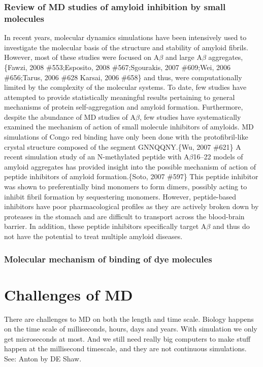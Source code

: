 \subsubsection{Review of MD studies of amyloid inhibition by small molecules}
\1 In recent years, molecular dynamics simulations have been intensively used to investigate the molecular basis of the structure and stability of amyloid fibrils. However, most of these studies were focused on A$\beta$ and large A$\beta$ aggregates,\{Fawzi, 2008 \#553;Esposito, 2008 \#567;Sgourakis, 2007 \#609;Wei, 2006 \#656;Tarus, 2006 \#628 Karsai, 2006 \#658\} and thus, were computationally limited by the complexity of the molecular systems. To date, few studies have attempted to provide statistically meaningful results pertaining to general mechanisms of protein self-aggregation and amyloid formation. Furthermore, despite the abundance of MD studies of A$\beta$, few studies have systematically examined the mechanism of action of small molecule inhibitors of amyloids. MD simulations of Congo red binding have only been done with the protofibril-like crystal structure composed of the segment GNNQQNY.\{Wu, 2007 \#621\} A recent simulation study of an N-methylated peptide with A$\beta$16--22 models of amyloid aggregates has provided insight into the possible mechanism of action of peptide inhibitors of amyloid formation.\{Soto, 2007 \#597\} This peptide inhibitor was shown to preferentially bind monomers to form dimers, possibly acting to inhibit fibril formation by sequestering monomers. However, peptide-based inhibitors have poor pharmacological profiles as they are actively broken down by proteases in the stomach and are difficult to transport across the blood-brain barrier. In addition, these peptide inhibitors specifically target A$\beta$ and thus do not have the potential to treat multiple amyloid diseases.

\subsubsection{Molecular mechanism of binding of dye molecules}




\section{Challenges of MD}  
\1 There are challenges to MD on both the length and time scale. Biology happens on the time scale of milliseconds, hours, days and years. With simulation we only get microseconds at most.  And we still need really big computers to make stuff happen at the millisecond timescale, and they are not continuous simulations. See: Anton by DE Shaw. 

